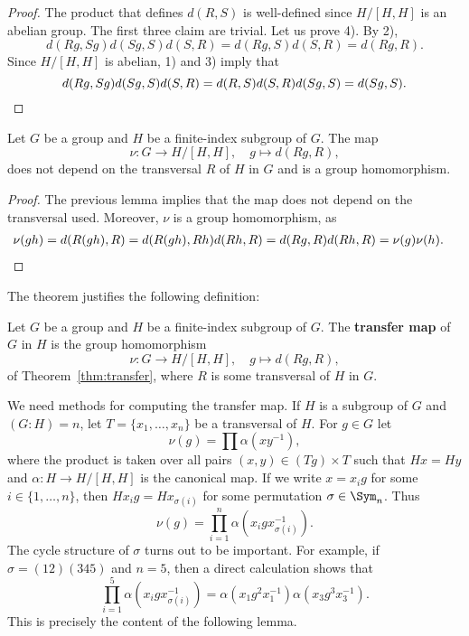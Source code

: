 \begin{proof}
	The product that defines $d(R,S)$ is well-defined since $H/[H,H]$ is 
	an abelian group. The first three claim are trivial. Let us prove
	4). By 2), 
	\[
		d(Rg,Sg)d(Sg,S)d(S,R)=d(Rg,S)d(S,R)=d(Rg,R).
	\]
	Since $H/[H,H]$ is abelian, 1) and 3) imply that 	
	\[
		d(Rg,Sg)d(Sg,S)d(S,R)=d(R,S)d(S,R)d(Sg,S)=d(Sg,S).\qedhere
	\]
\end{proof}

\begin{theorem}
	\label{thm:transfer}
	Let $G$ be a group and $H$ be a finite-index subgroup of $G$. The map 	
	\[
		\nu\colon G\to H/[H,H],\quad
		g\mapsto d(Rg,R),
	\]
	does not depend on the transversal $R$ of $H$ in $G$ and is a group
	homomorphism. 
\end{theorem}

\begin{proof}
	The previous lemma implies that the map does not depend on the transversal used. 
	Moreover, $\nu$ is a group homomorphism, as 
	\begin{align*}
		\nu(gh)&=d(R(gh),R)
		=d(R(gh),Rh)d(Rh,R)
		=d(Rg,R)d(Rh,R)=\nu(g)\nu(h).\qedhere
	\end{align*}
\end{proof}

The theorem justifies the following definition: 

\begin{definition}
	Let $G$ be a group and $H$ be a finite-index subgroup of $G$. The
	\textbf{transfer map} of $G$ in $H$ is the group homomorphism 
	\[
		\nu\colon G\to H/[H,H],
		\quad
		g\mapsto d(Rg,R),
	\]
	of Theorem~\ref{thm:transfer}, where $R$ is some transversal of $H$ in $G$.
\end{definition}

We need methods for computing the transfer map. If $H$ is a subgroup of 
$G$
and $(G:H)=n$, let $T=\{x_1,\dots,x_n\}$ be a transversal of $H$. For $g\in G$ let  
\[
	\nu(g)=\prod \alpha(xy^{-1}),
\]
where the product is taken over all pairs $(x,y)\in (Tg)\times T$ such that $Hx=Hy$
and $\alpha\colon H\to H/[H,H]$ is the canonical map. 
If we write 
$x=x_ig$ for some $i\in\{1,\dots,n\}$, then  
$Hx_ig=Hx_{\sigma(i)}$ for some permutation $\sigma\in\Sym_n$. Thus 
\[
	\nu(g)=\prod_{i=1}^n\alpha(x_igx_{\sigma(i)}^{-1}).
\]
The cycle structure of $\sigma$ turns out to be important. 
For example, if $\sigma=(12)(345)$ and $n=5$, then a direct calculation shows that 
\[
\prod_{i=1}^5\alpha\left(x_igx_{\sigma(i)}^{-1}\right)
=\alpha(x_1g^2x_1^{-1})\alpha(x_3g^3x_3^{-1}).
\]
This is precisely the content of the following lemma. 



